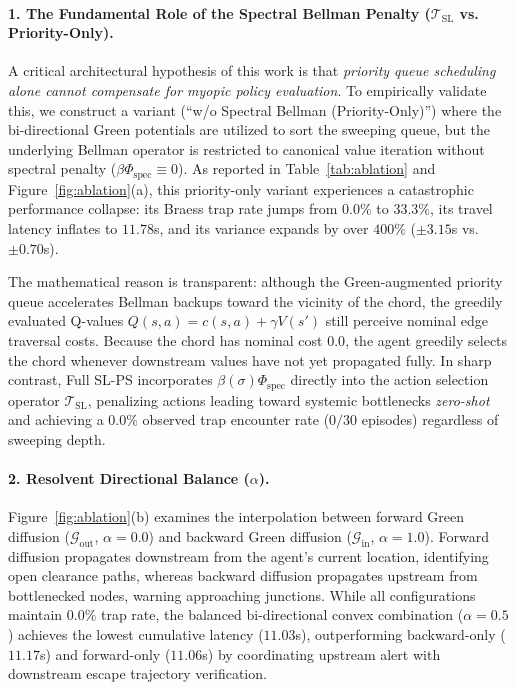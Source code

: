 \documentclass[11pt,a4paper]{article}
\begin{document}
\paragraph{1. The Fundamental Role of the Spectral Bellman Penalty ($\mathcal{T}_{\text{SL}}$ vs. Priority-Only).}
A critical architectural hypothesis of this work is that \textit{priority queue scheduling alone cannot compensate for myopic policy evaluation}. To empirically validate this, we construct a variant (``w/o Spectral Bellman (Priority-Only)'') where the bi-directional Green potentials are utilized to sort the sweeping queue, but the underlying Bellman operator is restricted to canonical value iteration without spectral penalty ($\beta \Phi_{\text{spec}} \equiv 0$). As reported in Table~\ref{tab:ablation} and Figure~\ref{fig:ablation}(a), this priority-only variant experiences a catastrophic performance collapse: its Braess trap rate jumps from $0.0\%$ to $33.3\%$, its travel latency inflates to $11.78$s, and its variance expands by over $400\%$ ($\pm 3.15$s vs. $\pm 0.70$s). 

The mathematical reason is transparent: although the Green-augmented priority queue accelerates Bellman backups toward the vicinity of the chord, the greedily evaluated Q-values $Q(s, a) = c(s, a) + \gamma V(s')$ still perceive nominal edge traversal costs. Because the chord has nominal cost $0.0$, the agent greedily selects the chord whenever downstream values have not yet propagated fully. In sharp contrast, Full SL-PS incorporates $\beta(\sigma) \Phi_{\text{spec}}$ directly into the action selection operator $\mathcal{T}_{\text{SL}}$, penalizing actions leading toward systemic bottlenecks \textit{zero-shot} and achieving a $0.0\%$ observed trap encounter rate ($0/30$ episodes) regardless of sweeping depth.

\paragraph{2. Resolvent Directional Balance ($\alpha$).}
Figure~\ref{fig:ablation}(b) examines the interpolation between forward Green diffusion ($\mathcal{G}_{\text{out}}$, $\alpha = 0.0$) and backward Green diffusion ($\mathcal{G}_{\text{in}}$, $\alpha = 1.0$). Forward diffusion propagates downstream from the agent's current location, identifying open clearance paths, whereas backward diffusion propagates upstream from bottlenecked nodes, warning approaching junctions. While all configurations maintain $0.0\%$ trap rate, the balanced bi-directional convex combination ($\alpha = 0.5$) achieves the lowest cumulative latency ($11.03$s), outperforming backward-only ($11.17$s) and forward-only ($11.06$s) by coordinating upstream alert with downstream escape trajectory verification.
\end{document}
